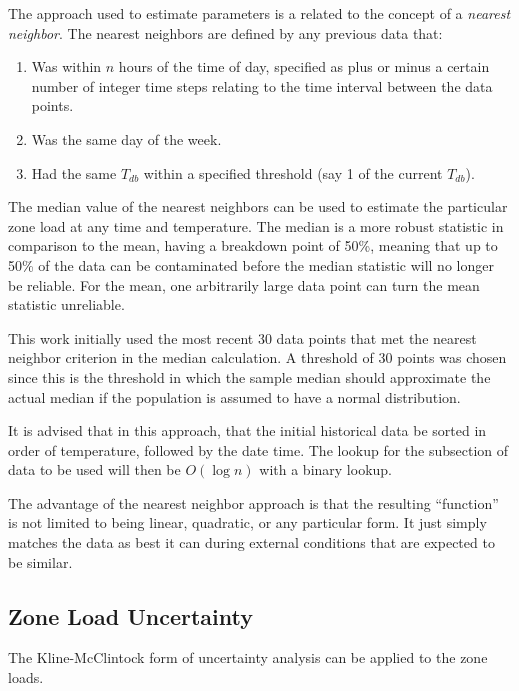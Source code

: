 The approach used to estimate parameters is a related to the concept of
a \textit{nearest neighbor}. The nearest neighbors are defined by any
previous data that:

\begin{enumerate}
    \item Was within \(n\) hours of the time of day, specified as
        plus or minus a certain number of integer time steps relating to
        the time interval between the data points.
\item Was the same day of the week.
\item Had the same \(T_{db}\) within a specified threshold (say \SI{1}{\degreeF} of the current \(T_{db}\)).
\end{enumerate}

The median value of the nearest neighbors can be used to estimate the
particular zone load at any time and temperature.  The median is a more robust
statistic in comparison to the mean, having a breakdown point of 50\%, meaning
that up to 50\% of the data can be contaminated before the median statistic
will no longer be reliable. For the mean, one arbitrarily large data point can
turn the mean statistic unreliable.

This work initially used the most recent 30 data points that met the
nearest neighbor criterion in the median calculation. A threshold of 30
points was chosen since this is the threshold in which the sample median
should approximate the actual median if the population is assumed to
have a normal distribution.

It is advised that in this approach, that the initial historical data be sorted
in order of temperature, followed by the date time.  The lookup for the
subsection of data to be used will then be \(O\left(\log n \right)\) with a
binary lookup.

The advantage of the nearest neighbor approach is that the resulting ``function''
is not limited to being linear, quadratic, or any particular form. It just
simply matches the data as best it can during external conditions that are
expected to be similar.

\subsection{Zone Load Uncertainty}

The Kline-McClintock form of uncertainty analysis can be applied to the
zone loads.

